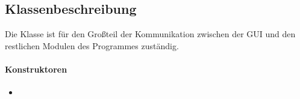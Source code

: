 \subsection{Klassenbeschreibung}


Die Klasse  ist für den Großteil der Kommunikation zwischen der GUI und den restlichen Modulen des Programmes zuständig.

\paragraph{Konstruktoren} %
\begin{itemize}
	\item {}
\end{itemize}

